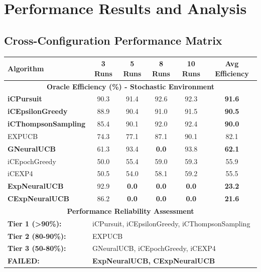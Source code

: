 \documentclass[12pt,a4paper]{article}
\newcommand{\critical}[1]{\textcolor{criticalcolor}{\textbf{#1}}}
\newcommand{\success}[1]{\textcolor{successcolor}{\textbf{#1}}}
\newcommand{\warning}[1]{\textcolor{warningcolor}{\textbf{#1}}}
\begin{document}
\section{Performance Results and Analysis}

\subsection{Cross-Configuration Performance Matrix}

\begin{longtable}{|l|c|c|c|c|c|}
\hline
\textbf{Algorithm} & \textbf{3 Runs} & \textbf{5 Runs} & \textbf{8 Runs} & \textbf{10 Runs} & \textbf{Avg Efficiency} \\
\hline
\hline
\multicolumn{6}{|c|}{\textbf{Oracle Efficiency (\%) - Stochastic Environment}} \\
\hline
\success{iCPursuit} & 90.3 & 91.4 & 92.6 & 92.3 & \success{\textbf{91.6}} \\
\success{iCEpsilonGreedy} & 88.9 & 90.4 & 91.0 & 91.5 & \success{90.5} \\
\success{iCThompsonSampling} & 85.4 & 90.1 & 92.0 & 92.4 & \success{90.0} \\
EXPUCB & 74.3 & 77.1 & 87.1 & 90.1 & 82.1 \\
\warning{GNeuralUCB} & 61.3 & 93.4 & \critical{0.0} & 93.8 & \warning{62.1} \\
iCEpochGreedy & 50.0 & 55.4 & 59.0 & 59.3 & 55.9 \\
iCEXP4 & 50.5 & 54.0 & 58.1 & 59.2 & 55.5 \\
\critical{ExpNeuralUCB} & 92.9 & \critical{0.0} & \critical{0.0} & \critical{0.0} & \critical{23.2} \\
\critical{CExpNeuralUCB} & 86.2 & \critical{0.0} & \critical{0.0} & \critical{0.0} & \critical{21.6} \\
\hline
\multicolumn{6}{|c|}{\textbf{Performance Reliability Assessment}} \\
\hline
\textbf{Tier 1 (>90\%):} & \multicolumn{5}{|l|}{iCPursuit, iCEpsilonGreedy, iCThompsonSampling} \\
\textbf{Tier 2 (80-90\%):} & \multicolumn{5}{|l|}{EXPUCB} \\
\textbf{Tier 3 (50-80\%):} & \multicolumn{5}{|l|}{GNeuralUCB, iCEpochGreedy, iCEXP4} \\
\textbf{FAILED:} & \multicolumn{5}{|l|}{\critical{ExpNeuralUCB, CExpNeuralUCB}} \\
\hline
\end{longtable}
\end{document}
